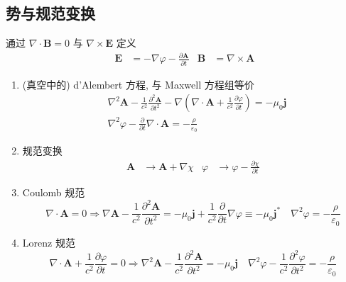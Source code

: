 \documentclass[12pt,a4paper]{article}%
\numberwithin{equation}{section}%
\renewcommand*{\vec}[1]{\bm{#1}}%
\begin{document}
\subsection{势与规范变换} %
\label{sub:potential}
通过 $\nabla\cdot\vec B = 0$ 与 $\nabla\times\vec E$ 定义
\begin{align}
    \vec E &= -\nabla\varphi - \frac{\partial\vec A}{\partial t} &
    \vec B &= \nabla\times\vec A
\end{align}
\begin{enumerate}
    \item (真空中的) d'Alembert 方程, 与 Maxwell 方程组等价
    \begin{align}
        &\nabla^2\vec A - \frac 1{c^2}\frac{\partial^2\vec A}{\partial t^2} - \nabla\left(\nabla\cdot\vec A + \frac 1{c^2}\frac{\partial \varphi}{\partial t}\right) = -\mu_0\vec j \\
        &\nabla^2\varphi - \frac{\partial}{\partial t}\nabla\cdot\vec A = -\frac{\rho}{\varepsilon_0}
    \end{align}
    \item 规范变换
    \begin{align}
     \vec A &\rightarrow \vec A + \nabla\chi 
     &\varphi &\rightarrow \varphi - \frac{\partial\chi}{\partial t}
    \end{align}
    \item Coulomb 规范
    \begin{equation}
        \nabla\cdot\vec A = 0\Longrightarrow 
        \nabla\vec A - \frac 1{c^2}\frac{\partial^2\vec A}{\partial t^2} = -\mu_0\vec j + \frac 1{c^2}\frac{\partial}{\partial t}\nabla\varphi \equiv -\mu_0\vec j^* \quad
        \nabla^2\varphi = -\frac{\rho}{\varepsilon_0}
    \end{equation}
    \item Lorenz 规范
    \begin{equation}
        \nabla\cdot\vec A + \frac 1{c^2}\frac{\partial \varphi}{\partial t} = 0\Longrightarrow
        \nabla^2\vec A - \frac 1{c^2}\frac{\partial^2\vec A}{\partial t^2} = -\mu_0\vec j \quad
        \nabla^2\varphi - \frac 1{c^2}\frac{\partial^2\varphi}{\partial t^2} = -\frac{\rho}{\varepsilon_0}
    \end{equation}
\end{enumerate}
\end{document}
